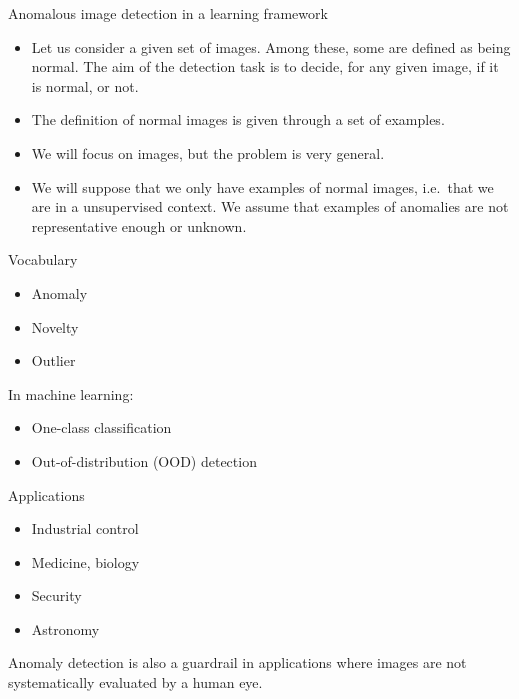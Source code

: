 \documentclass[xcolor=pdftex,dvipsnames,table,mathserif]{beamer}
\begin{document}
\begin{frame}{Anomalous image detection in a learning framework}

  \begin{block}{}
    \begin{itemize}
    \item Let us consider a given set of images. Among these, some  are defined as being \alert{normal}. The aim of the detection task is to decide, for any given image, if it is normal, or not.
    \item The definition of normal images is given through a set of examples.
    \end{itemize}
  \end{block}

  \begin{itemize}
  \item We will focus on images, but the problem is very general.
  \item We will suppose that we only have examples of normal images, i.e.\ that we are in a \alert{unsupervised} context. We assume that examples of anomalies are not representative enough or unknown.
  \end{itemize}

\end{frame}

\begin{frame}{Vocabulary}

  \begin{itemize}
  \item Anomaly
  \item Novelty
  \item Outlier
  \end{itemize}

  In machine learning:

\begin{itemize}
\item One-class classification
\item Out-of-distribution (OOD) detection
\end{itemize}


\end{frame}


\begin{frame}{Applications}

\begin{itemize}
\item Industrial control
\item Medicine, biology
\item Security
\item Astronomy
\end{itemize}

\vspace{1em}
\pause
\begin{block}{}
Anomaly detection is also a guardrail in applications where images are not systematically evaluated by a human eye.
\end{block}

\end{frame}
\end{document}
